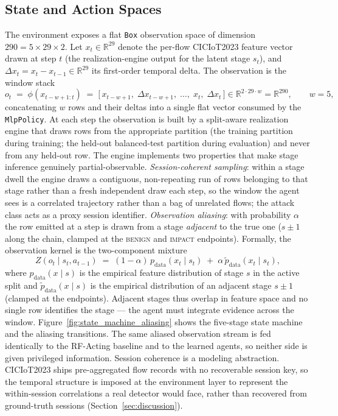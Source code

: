 \subsection{State and Action Spaces}\label{ssec:state_action}
The environment exposes a flat \texttt{Box} observation space of dimension $290 = 5 \times 29 \times 2$. Let $x_t \in \mathbb{R}^{29}$ denote the per-flow CICIoT2023 feature vector drawn at step $t$ (the realization-engine output for the latent stage $s_t$), and $\Delta x_t = x_t - x_{t-1} \in \mathbb{R}^{29}$ its first-order temporal delta. The observation is the window stack
\begin{equation}\label{eq:obs_stack}
o_t \;=\; \phi(x_{t-w+1:t}) \;=\; \big[\, x_{t-w+1},\; \Delta x_{t-w+1},\; \dots,\; x_t,\; \Delta x_t \,\big] \in \mathbb{R}^{2 \cdot 29 \cdot w} = \mathbb{R}^{290}, \qquad w = 5,
\end{equation}
concatenating $w$ rows and their deltas into a single flat vector consumed by the \texttt{MlpPolicy}. At each step the observation is built by a split-aware realization engine that draws rows from the appropriate partition (the training partition during training; the held-out balanced-test partition during evaluation) and never from any held-out row. The engine implements two properties that make stage inference genuinely partial-observable. \emph{Session-coherent sampling}: within a stage dwell the engine draws a contiguous, non-repeating run of rows belonging to that stage rather than a fresh independent draw each step, so the window the agent sees is a correlated trajectory rather than a bag of unrelated flows; the attack class acts as a proxy session identifier. \emph{Observation aliasing}: with probability $\alpha$ the row emitted at a step is drawn from a stage \emph{adjacent} to the true one ($s \pm 1$ along the chain, clamped at the \textsc{benign} and \textsc{impact} endpoints). Formally, the observation kernel is the two-component mixture
\begin{equation}\label{eq:aliasing_kernel}
Z(o_t \mid s_t, a_{t-1}) \;=\; (1-\alpha)\, p_{\text{data}}(x_t \mid s_t) \;+\; \alpha\, \widetilde{p}_{\text{data}}(x_t \mid s_t),
\end{equation}
where $p_{\text{data}}(x \mid s)$ is the empirical feature distribution of stage $s$ in the active split and $\widetilde{p}_{\text{data}}(x \mid s)$ is the empirical distribution of an adjacent stage $s \pm 1$ (clamped at the endpoints). Adjacent stages thus overlap in feature space and no single row identifies the stage --- the agent must integrate evidence across the window. Figure~\ref{fig:state_machine_aliasing} shows the five-stage state machine and the aliasing transitions. The same aliased observation stream is fed identically to the RF-Acting baseline and to the learned agents, so neither side is given privileged information. Session coherence is a modeling abstraction. CICIoT2023 ships pre-aggregated flow records with no recoverable session key, so the temporal structure is imposed at the environment layer to represent the within-session correlations a real detector would face, rather than recovered from ground-truth sessions (Section~\ref{sec:discussion}).

